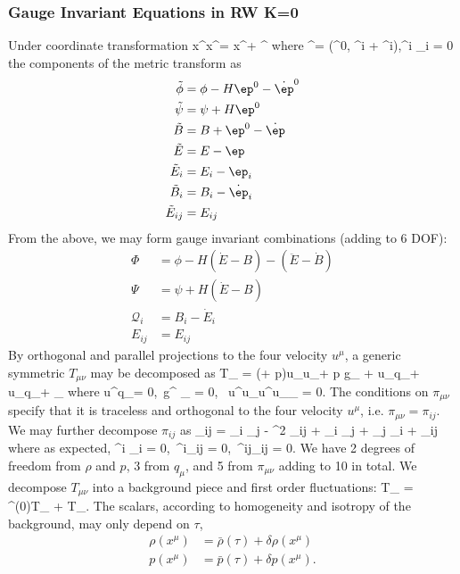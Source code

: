 \documentclass[10pt,letterpaper]{article}
\begin{document}
\subsubsection{Gauge Invariant Equations in RW K=0}
Under coordinate transformation
\be
	x^\mu \to \tilde x^\mu = x^\mu + \ep^\mu
\ee
where 
\be
	\ep^\mu = (\ep^0, \del^i \ep + \ep^i),\qquad \del^i \ep_i = 0
\ee
the components of the metric transform as
\begin{align}
	\tilde \phi &= \phi - H \ep^0 - \dot \ep^0\\
	\tilde \psi &= \psi + H \ep^0\\
	\tilde B &=B + \ep^0 - \dot \ep\\
	\tilde E &= E-\ep \\
	\tilde E_{i}&= E_i - \ep_i\\
	\tilde B_i &= B_i - \dot \ep_i\\
	\tilde E_{ij} &= E_{ij}
\end{align}
From the above, we may form gauge invariant combinations (adding to 6 DOF):
\begin{align}
	\Phi &= \phi - H(\dot E - B) - (\ddot E - \dot B)\\
	\Psi &= \psi + H(\dot E-B)\\
	\mathcal Q_i &= B_i - \dot E_i\\
	E_{ij} &= E_{ij}
\end{align}
By orthogonal and parallel projections to the four velocity $u^\mu$, a generic symmetric $T_{\mu\nu}$ may be decomposed as
\be
	T_{\mu\nu} = (\rho + p)u_\mu u_\nu + p g_{\mu\nu} + u_\nu q_\mu + u_\mu q_\nu + \pi_{\mu\nu}
\ee
where
\be
	u^\mu q_\mu = 0,\ g^{\mu\nu} \pi_{\mu\nu} = 0, \ u^\mu u_\nu u^\rho u_\sigma \pi_{\nu\sigma} = 0.
\ee
The conditions on $\pi_{\mu\nu}$ specify that it is traceless and orthogonal to the four velocity $u^\mu$, i.e. $\pi_{\mu\nu} = \pi_{ij}$. We may further decompose $\pi_{ij}$ as
\be
	\pi_{ij} = \del_i \del_j \Pi -  \del^2 \Pi \delta_{ij} +  \del_i \Pi_j +  \del_j \Pi_i + \Pi_{ij}
\ee
where as expected,
\be
	\del^i \Pi_i = 0,\  \del^i\Pi_{ij} = 0,\ \delta^{ij}\Pi_{ij} = 0.
\ee
We have 2 degrees of freedom from $\rho$ and $p$, 3 from $q_\mu$, and 5 from $\pi_{\mu\nu}$ adding to 10 in total. We decompose $T_{\mu\nu}$ into a background piece and first order fluctuations:
\be
	T_{\mu\nu} = {}^{(0)}T_{\mu\nu} + \delta T_{\mu\nu}.
\ee
The scalars, according to homogeneity and isotropy of the background, may only depend on $\tau$, 
\begin{align}
	\rho(x^\mu) &= \bar \rho(\tau) + \delta \rho(x^\mu)\\
	p(x^\mu) &= \bar p(\tau) + \delta p(x^\mu).
\end{align}
\end{document}
